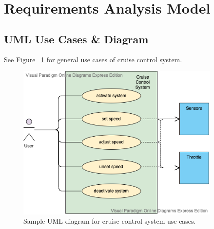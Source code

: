 \documentclass[preprint,11pt,3p]{article}
\begin{document}
\section{Requirements Analysis Model}

\subsection{UML Use Cases \& Diagram} 
See Figure ~\ref{fig:ccUML1} for general use cases of cruise control system.
	\begin{figure}[H]
		\includegraphics[width=0.9\textwidth]{images/useCaseUML.png}
		\caption{Sample UML diagram for cruise control system use cases.}
		\label{fig:ccUML1}
	\end{figure}
\end{document}
